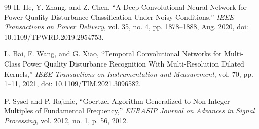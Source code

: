 \documentclass[12pt,a4paper]{report}
\begin{document}
\begin{thebibliography}{99}
H. He, Y. Zhang, and Z. Chen, ``A Deep Convolutional Neural Network for Power Quality Disturbance Classification Under Noisy Conditions,'' \textit{IEEE Transactions on Power Delivery}, vol. 35, no. 4, pp. 1878--1888, Aug. 2020, doi: 10.1109/TPWRD.2019.2954753.

L. Bai, F. Wang, and G. Xiao, ``Temporal Convolutional Networks for Multi-Class Power Quality Disturbance Recognition With Multi-Resolution Dilated Kernels,'' \textit{IEEE Transactions on Instrumentation and Measurement}, vol. 70, pp. 1--11, 2021, doi: 10.1109/TIM.2021.3096582.

P. Sysel and P. Rajmic, ``Goertzel Algorithm Generalized to Non-Integer Multiples of Fundamental Frequency,'' \textit{EURASIP Journal on Advances in Signal Processing}, vol. 2012, no. 1, p. 56, 2012.

\end{thebibliography}
\end{document}
